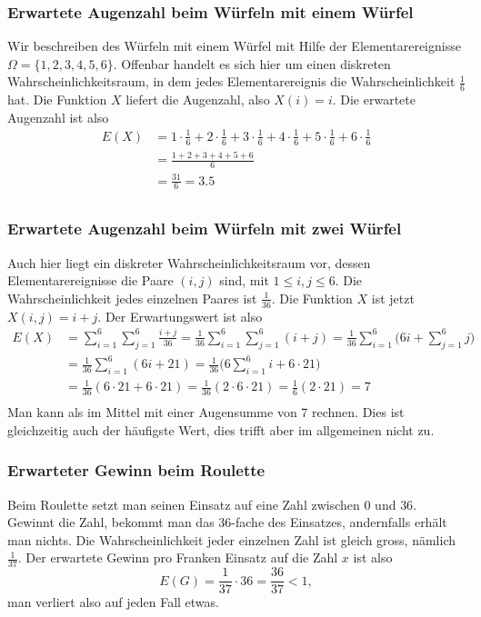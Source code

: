 \subsubsection{Erwartete Augenzahl beim Würfeln mit einem Würfel}
Wir beschreiben des Würfeln mit einem Würfel mit Hilfe der
Elementarereignisse $\Omega=\{1,2,3,4,5,6\}$.
Offenbar handelt es sich
hier um einen diskreten Wahrscheinlichkeitsraum, in dem jedes
Elementarereignis die Wahrscheinlichkeit $\frac16$ hat.
Die Funktion
$X$ liefert die Augenzahl, also $X(i)=i$.
Die erwartete Augenzahl
ist also
\begin{align*}
E(X)&=
1\cdot\frac16+
2\cdot\frac16+
3\cdot\frac16+
4\cdot\frac16+
5\cdot\frac16+
6\cdot\frac16\\
&=\frac{1+2+3+4+5+6}6\\
&=\frac{31}{6}=3.5\\
\end{align*}
\subsubsection{Erwartete Augenzahl beim Würfeln mit zwei Würfel}
Auch hier liegt ein diskreter Wahrscheinlichkeitsraum vor, dessen
Elementarereignisse die Paare $(i,j)$ sind, mit $1\le i,j\le 6$.
Die Wahrscheinlichkeit jedes einzelnen Paares ist $\frac1{36}$.
Die Funktion $X$ ist jetzt $X(i,j)=i+j$.
Der Erwartungswert ist
also
\begin{align*}
E(X)&=\sum_{i=1}^6\sum_{j=1}^6\frac{i+j}{36}
=\frac1{36}\sum_{i=1}^6\sum_{j=1}^6(i+j)
=\frac1{36}\sum_{i=1}^6\bigl(6i + \sum_{j=1}^6j\bigr)\\
&=\frac1{36}\sum_{i=1}^6(6i + 21)
=\frac1{36}\bigl(6\sum_{i=1}^6i + 6\cdot21 \bigr)\\
&=\frac1{36}(6\cdot 21 + 6\cdot21 )
=\frac1{36}(2\cdot 6\cdot 21)
=\frac1{6}(2\cdot 21)
=7\\
\end{align*}
Man kann als im Mittel mit einer Augensumme von 7 rechnen.
Dies ist
gleichzeitig auch der häufigste Wert, dies trifft aber im allgemeinen
nicht zu.

\subsubsection{Erwarteter Gewinn beim Roulette}
Beim Roulette setzt man seinen Einsatz auf eine Zahl zwischen $0$
und $36$.
Gewinnt die Zahl, bekommt man das 36-fache des Einsatzes,
andernfalls erhält man nichts.
Die Wahrscheinlichkeit jeder einzelnen
Zahl ist gleich gross, nämlich $\frac1{37}$.
Der erwartete Gewinn pro
Franken Einsatz auf die Zahl $x$ ist also
\[
E(G)= \frac1{37}\cdot 36=\frac{36}{37}<1,
\]
man verliert also auf jeden Fall etwas.

